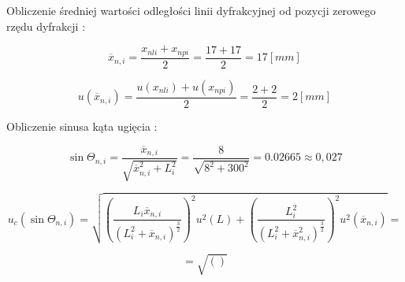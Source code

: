 \documentclass[12pt]{article}
\begin{document}
Obliczenie średniej wartości odległości linii dyfrakcyjnej od pozycji
zerowego rzędu dyfrakcji : 

$$ \overline{x}_{n,i} = \frac{x_{nli} + x_{npi}}{2} = \frac{17 + 17}{2} = 17[mm]$$

$$ u(\overline{x}_{n,i}) = \frac{u(x_{nli}) + u(x_{npi})}{2} = \frac{2 + 2}{2} = 2[mm] $$

Obliczenie sinusa kąta ugięcia :

$$ \sin \Theta_{n,i} = \frac{\overline{x}_{n,i}}{\sqrt{\overline{x}^{2}_{n,i} + L^{2}_i}}
= \frac{8}{\sqrt{8^2 + 300^2}} = 0.02665 \approx 0,027 $$

$$ u_c(\sin \Theta_{n,i}) = \sqrt{\left(\frac{L_i \overline{x}_{n,i}}{\left(L^2_i + \overline{x}_{n,i}\right)^{\frac{3}{2}}}\right)^2 u^2(L) + 
\left(\frac{L^2_i}{(L^2_i + \overline{x}^2_{n,i})^{\frac{3}{2}}}\right)^2 u^2(\overline{x}_{n,i})} = $$

$$ = \sqrt{\left( \right)} $$
\end{document}
